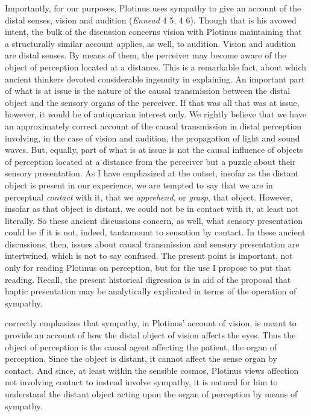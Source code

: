 Importantly, for our purposes, Plotinus uses sympathy to give an account of the distal senses, vision and audition (\emph{Ennead} 4 5, 4 6). Though that is his avowed intent, the bulk of the discussion concerns vision with Plotinus maintaining that a structurally similar account applies, as well, to audition. Vision and audition are distal senses. By means of them, the perceiver may become aware of the object of perception located at a distance. This is a remarkable fact, about which ancient thinkers devoted considerable ingenuity in explaining. An important part of what is at issue is the nature of the causal transmission between the distal object and the sensory organs of the perceiver. If that was all that was at issue, however, it would be of antiquarian interest only. We rightly believe that we have an approximately correct account of the causal transmission in distal perception involving, in the case of vision and audition, the propagation of light and sound waves. But, equally, part of what is at issue is not the causal influence of objects of perception located at a distance from the perceiver but a puzzle about their sensory presentation. As I have emphasized at the outset, insofar as the distant object is present in our experience, we are tempted to say that we are in perceptual \emph{contact} with it, that we \emph{apprehend}, or \emph{grasp}, that object. However, insofar as that object is distant, we could not be in contact with it, at least not literally. So these ancient discussions concern, as well, what sensory presentation could be if it is not, indeed, tantamount to sensation by contact. In these ancient discussions, then, issues about causal transmission and sensory presentation are intertwined, which is not to say confused. The present point is important, not only for reading Plotinus on perception, but for the use I propose to put that reading. Recall, the present historical digression is in aid of the proposal that haptic presentation may be analytically explicated in terms of the operation of sympathy.

\citet[chapter 3]{Emilsson:1988uq} correctly emphasizes that sympathy, in Plotinus' account of vision, is meant to provide an account of how the distal object of vision affects the eyes. Thus the object of perception is the causal agent affecting the patient, the organ of perception. Since the object is distant, it cannot affect the sense organ by contact. And since, at least within the sensible cosmos, Plotinus views affection not involving contact to instead involve sympathy, it is natural for him to understand the distant object acting upon the organ of perception by means of sympathy. 

